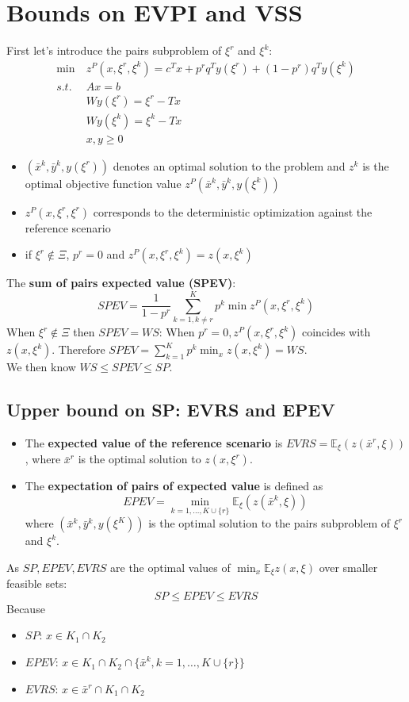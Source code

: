 \documentclass[12pt, openany]{report}
\newcommand{\E}{\mathbb{E}}
\theoremstyle{definition}
\begin{document}
\section{Bounds on EVPI and VSS}
First let's introduce the pairs subproblem of $\xi^r$ and $\xi^k$:
\begin{equation}
	\begin{aligned}
		\min \: &z^P (x, \xi^r,\xi^k) = c^Tx + p^rq^Ty(\xi^r) + (1-p^r)q^Ty(\xi^k)\\
		s.t. \: &Ax = b\\
		&Wy(\xi^r) = \xi^r-Tx\\
		&Wy(\xi^k) = \xi^k-Tx\\
		&x,y\geq0
	\end{aligned}
\end{equation}
\begin{itemize}
	\item $(\bar{x}^k , \bar{y}^k , y(\xi^r ))$ denotes an optimal solution to the problem and $z^k$ is the optimal objective function value $z^P (\bar{x}^k , \bar{y}^k , y(\xi^k ))$
	\item $z^P (x, \xi^r , \xi^r)$ corresponds to the deterministic optimization against the
	reference scenario
	\item if $\xi^r \notin \Xi$, $p^r = 0$ and $z^P (x, \xi^r , \xi^k ) = z(x, \xi^k )$
\end{itemize}
The \textbf{sum of pairs expected value (SPEV)}:
\begin{equation}
	SPEV = \frac{1}{1-p^r} \sum_{k=1,k \neq r}^{K} p^k \min z^P(x, \xi^r,\xi^k)
\end{equation}
When $\xi^r \notin \Xi$ then $SPEV = WS$: When $p^r = 0, z^P(x,\xi^r,\xi^k)$ coincides with $z(x,\xi^k)$. Therefore $SPEV = \sum_{k=1}^{K} p^k \min_x z(x,\xi^k) = WS$.\\
We then know $WS \leq SPEV \leq SP$.
\subsection{Upper bound on SP: EVRS and EPEV}
\begin{itemize}
	\item The \textbf{expected value of the reference scenario} is $EVRS =  \E_\xi(z(\bar{x}^r,\xi))$, where $\bar{x}^r$ is the optimal solution to $z(x,\xi^r)$.
	\item The \textbf{expectation of pairs of expected value} is defined as \[EPEV = \min_{k=1,\dots,K\cup\{r\}}\E_\xi(z(\bar{x}^k,\xi))\] where $(\bar{x}^k,\bar{y}^k, y(\xi^K))$ is the optimal solution to the pairs subproblem of $\xi^r$ and $\xi^k$.
\end{itemize}
As $SP,EPEV,EVRS$ are the optimal values of $\min_x \E_\xi z(x,\xi)$ over smaller feasible sets:
\begin{equation}
	SP \leq EPEV \leq EVRS
\end{equation}
Because
\begin{itemize}
	\item $SP$: $x \in K_1 \cap K_2$
	\item $EPEV$: $x \in K_1 \cap K_2 \cap \{\bar{x}^k,k=1,\dots,K\cup\{r\}\}$
	\item $EVRS$: $x \in \bar{x}^r \cap K_1 \cap K_2$
\end{itemize}
\end{document}
